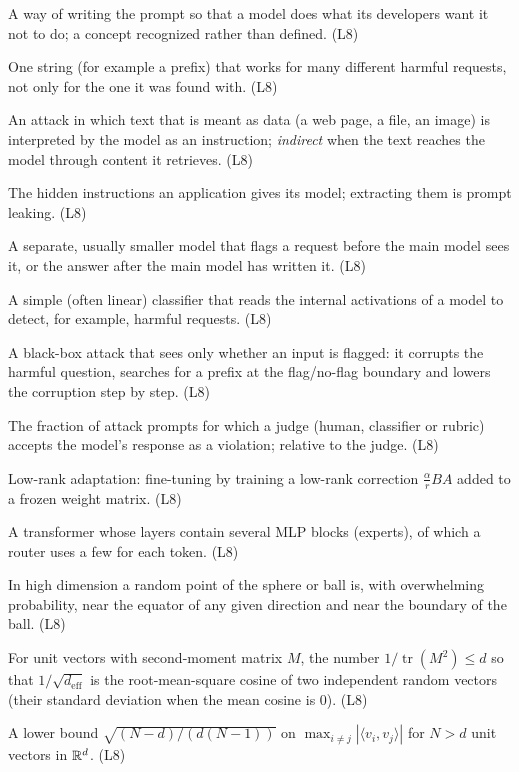 \begin{description}[style=nextline, leftmargin=0pt, itemsep=0.35em]
  \item[Jailbreak] A way of writing the prompt so that a model does what its developers want it not to do; a concept recognized rather than defined. (L8)
  \item[Universal jailbreak] One string (for example a prefix) that works for many different harmful requests, not only for the one it was found with. (L8)
  \item[Prompt injection] An attack in which text that is meant as data (a web page, a file, an image) is interpreted by the model as an instruction; \emph{indirect} when the text reaches the model through content it retrieves. (L8)
  \item[System prompt, prompt leaking] The hidden instructions an application gives its model; extracting them is prompt leaking. (L8)
  \item[Input / output classifier] A separate, usually smaller model that flags a request before the main model sees it, or the answer after the main model has written it. (L8)
  \item[Activation probe] A simple (often linear) classifier that reads the internal activations of a model to detect, for example, harmful requests. (L8)
  \item[Boundary point jailbreaking] A black-box attack that sees only whether an input is flagged: it corrupts the harmful question, searches for a prefix at the flag/no-flag boundary and lowers the corruption step by step. (L8)
  \item[Attack success rate] The fraction of attack prompts for which a judge (human, classifier or rubric) accepts the model's response as a violation; relative to the judge. (L8)
  \item[LoRA] Low-rank adaptation: fine-tuning by training a low-rank correction $\frac{\alpha}{r}BA$ added to a frozen weight matrix. (L8)
  \item[Mixture of experts] A transformer whose layers contain several MLP blocks (experts), of which a router uses a few for each token. (L8)
  \item[Concentration of measure] In high dimension a random point of the sphere or ball is, with overwhelming probability, near the equator of any given direction and near the boundary of the ball. (L8)
  \item[Effective dimension] For unit vectors with second-moment matrix $M$, the number $1/\operatorname{tr}(M^2)\le d$ so that $1/\sqrt{d_{\mathrm{eff}}}$ is the root-mean-square cosine of two independent random vectors (their standard deviation when the mean cosine is $0$). (L8)
  \item[Welch bound] A lower bound $\sqrt{(N-d)/(d(N-1))}$ on $\max_{i\neq j}|\langle v_i,v_j\rangle|$ for $N>d$ unit vectors in $\mathbb{R}^d$. (L8)

\end{description}

